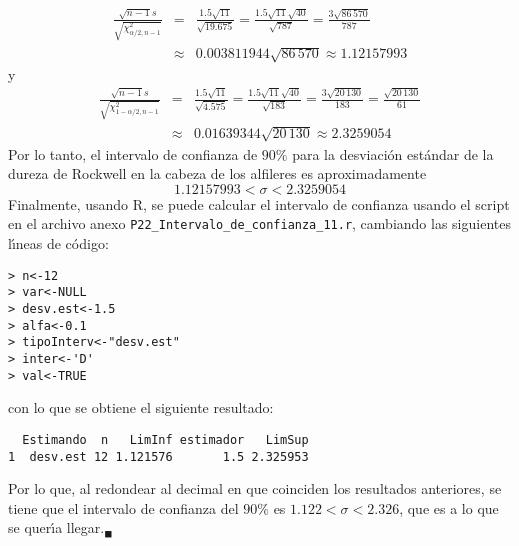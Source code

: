 \begin{solucion}
 \begin{eqnarray*}
  \frac{\sqrt{n-1}s}{\sqrt{\chi^2_{\alpha/2,n-1}}} & = & \frac{1.5\sqrt{11}}{\sqrt{19.675}} = \frac{1.5\sqrt{11}\sqrt{40}}{\sqrt{787}} = \frac{3\sqrt{86\,570}}{787} \\
  & \approx & 0.003811944\sqrt{86\,570} \approx 1.12157993
 \end{eqnarray*}
 y
 \begin{eqnarray*}
  \frac{\sqrt{n-1}s}{\sqrt{\chi^2_{1-\alpha/2,n-1}}} & = & \frac{1.5\sqrt{11}}{\sqrt{4.575}} = \frac{1.5\sqrt{11}\sqrt{40}}{\sqrt{183}} = \frac{3\sqrt{20\,130}}{183} = \frac{\sqrt{20\,130}}{61} \\
  & \approx & 0.01639344\sqrt{20\,130} \approx 2.3259054
 \end{eqnarray*}
 Por lo tanto, el intervalo de confianza de $90\%$ para la desviaci\'on est\'andar de la dureza de Rockwell en la cabeza de los alfileres es aproximadamente
 \begin{equation*}
  1.12157993 < \sigma < 2.3259054
 \end{equation*}
 Finalmente, usando R, se puede calcular el intervalo de confianza usando el script en el archivo anexo \texttt{P22\_Intervalo\_de\_confianza\_11.r}, cambiando las siguientes l\'{\i}neas de c\'odigo:
 \begin{verbatim}
> n<-12
> var<-NULL
> desv.est<-1.5
> alfa<-0.1
> tipoInterv<-"desv.est"
> inter<-'D'
> val<-TRUE
 \end{verbatim}
 \vspace{-0.5cm}
 con lo que se obtiene el siguiente resultado:
 \begin{verbatim}
  Estimando  n   LimInf estimador   LimSup
1  desv.est 12 1.121576       1.5 2.325953
 \end{verbatim}
 \vspace{-0.5cm}
 Por lo que, al redondear al decimal en que coinciden los resultados anteriores, se tiene que el intervalo de confianza del $90\%$ es $1.122 < \sigma < 2.326$, que es a lo que se quer\'{\i}a llegar.${}_{\blacksquare}$
\end{solucion}

